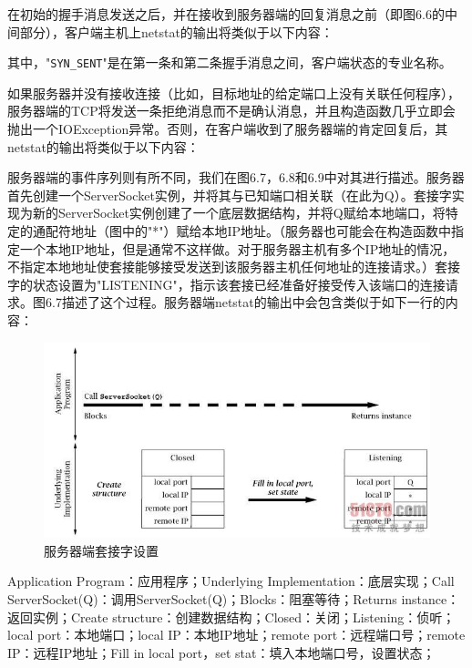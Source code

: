 		在初始的握手消息发送之后，并在接收到服务器端的回复消息之前（即图6.6的中间部分），客户端主机上netstat的输出将类似于以下内容：

		

		其中，"\verb|SYN_SENT|"是在第一条和第二条握手消息之间，客户端状态的专业名称。

		如果服务器并没有接收连接（比如，目标地址的给定端口上没有关联任何程序），服务器端的TCP将发送一条拒绝消息而不是确认消息，并且构造函数几乎立即会抛出一个IOException异常。否则，在客户端收到了服务器端的肯定回复后，其netstat的输出将类似于以下内容：

		

		服务器端的事件序列则有所不同，我们在图6.7，6.8和6.9中对其进行描述。服务器首先创建一个ServerSocket实例，并将其与已知端口相关联（在此为Q）。套接字实现为新的ServerSocket实例创建了一个底层数据结构，并将Q赋给本地端口，将特定的通配符地址（图中的"*"）赋给本地IP地址。（服务器也可能会在构造函数中指定一个本地IP地址，但是通常不这样做。对于服务器主机有多个IP地址的情况，不指定本地地址使套接能够接受发送到该服务器主机任何地址的连接请求。）套接字的状态设置为"LISTENING"，指示该套接已经准备好接受传入该端口的连接请求。图6.7描述了这个过程。服务器端netstat的输出中会包含类似于如下一行的内容：

		

		\clearpage

		\begin{figure}[htbp]%
			\centering
			\includegraphics[scale=.6]{img/06.07.jpg}
			\caption{服务器端套接字设置}
			\label{fig:server.create.socket}
		\end{figure}

		Application Program：应用程序；Underlying Implementation：底层实现；Call ServerSocket(Q)：调用ServerSocket(Q)；Blocks：阻塞等待；Returns instance：返回实例；Create structure：创建数据结构；Closed：关闭；Listening：侦听；local port：本地端口；local IP：本地IP地址；remote port：远程端口号；remote IP：远程IP地址；Fill in local port，set stat：填入本地端口号，设置状态；

